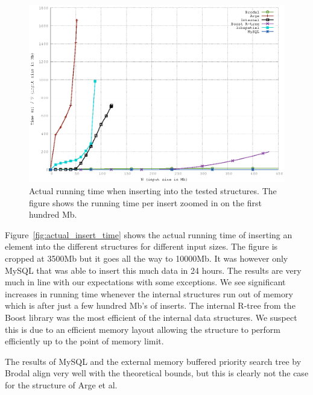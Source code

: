 \documentclass[twoside,11pt,openright]{report}
\begin{document}
\begin{figure}[htp!]
\includegraphics[width=\textwidth]{../src/experiments/insert_experiment_results/2016-05-06.14_11_08/time_zoom}
\caption{Actual running time when inserting into the tested structures. The figure shows the running time per insert zoomed in on the first hundred Mb.}
\label{fig:actual_insert_time_zoomed}
\end{figure}

Figure~\ref{fig:actual_insert_time} shows the actual running time of inserting an element into the different structures for different input sizes. 
The figure is cropped at 3500Mb but it goes all the way to 10000Mb. It was however only MySQL that was able to insert this much data in 24 hours.
The results are very much in line with our expectations with some exceptions. We see significant increases in running time whenever the internal structures run out of memory which is after just a few hundred Mb's of inserts. The internal R-tree from the Boost library was the most efficient of the internal data structures. We suspect this is due to an efficient memory layout allowing the structure to perform efficiently up to the point of memory limit.

The results of MySQL and the external memory buffered priority search tree by Brodal align very well with the theoretical bounds, but this is clearly not the case for the structure of Arge et al. 
\end{document}
